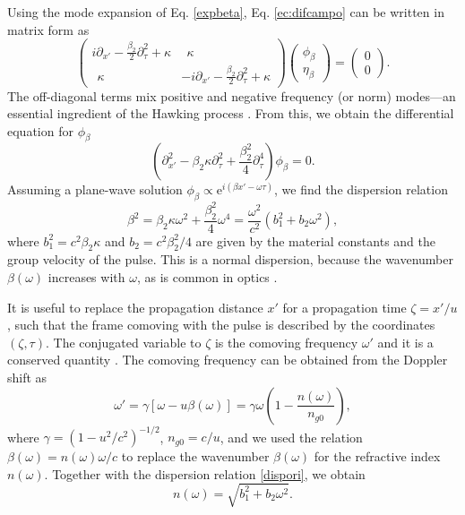 \documentclass[aps,pra,reprint,amsmath,amssymb,showpacs,groupedaddress,floatfix]{revtex4-1}
\begin{document}
Using the mode expansion of Eq. \eqref{expbeta}, Eq. \eqref{ec:difcampo} can be written in matrix form as
\begin{equation}
\begin{pmatrix}	
i\partial_{x'}-\frac{\beta_2}{2}\partial_{\tau}^2+\kappa & \ \ \kappa\\ 
\ \ \kappa & -i\partial_{x'}-\frac{\beta_2}{2}\partial_{\tau}^2+ \kappa
\end{pmatrix}\begin{pmatrix}
\phi_{\beta}\\
\eta_{\beta}
\end{pmatrix}=\begin{pmatrix}
0\\
0
\end{pmatrix}.
\end{equation}
The off-diagonal terms mix positive and negative frequency (or norm) modes---an essential ingredient of the Hawking process \cite{Robertson2012jpb}. From this, we obtain the differential equation for $\phi_\beta$
\begin{equation}
\left(\partial_{x'}^2-\beta_2\kappa\partial_{\tau}^2+\frac{\beta_2^2}{4}\partial_{\tau}^4\right)\phi_{\beta}=0.
\label{waveeq}
\end{equation}
Assuming a plane-wave solution $\phi_{\beta}\propto \text{e}^{i(\beta x'-\omega\tau)}$, we find the dispersion relation
\begin{equation}\label{dispori}
\beta^2=\beta_2 \kappa \omega^2+\frac{\beta_2^2}{4}\omega^4=\frac{\omega^2}{c^2}\left(b_1^2+b_2\omega^2\right),
\end{equation}
where $b_1^2=c^2\beta_2 \kappa$ and $b_2=c^2\beta_2^2/4$ are given by the material constants and the group velocity of the pulse. This is a normal dispersion, because the wavenumber $\beta(\omega)$ increases with $\omega$, as is common in optics \cite{GaonaReyes2017}.

It is useful to replace the propagation distance $x'$ for a propagation time $\zeta=x'/u$, such that the frame comoving with the pulse is described by the coordinates $(\zeta,\tau)$. The conjugated variable to $\zeta$ is the comoving frequency $\omega'$ and it is a conserved quantity \cite{Bermudez2016pra,Robertson2012jpb}. The comoving frequency can be obtained from the Doppler shift as
\begin{equation}\label{ecdoppler}
\omega'=\gamma[\omega-u\beta(\omega)]=\gamma\omega\left(1-\frac{n(\omega)}{n_{g0}}\right),
\end{equation}
where $\gamma=(1-u^2/c^2)^{-1/2}$, $n_{g0}=c/u$, and we used the relation $\beta(\omega)=n(\omega)\omega/c$ to replace the wavenumber $\beta(\omega)$ for the refractive index $n(\omega)$. Together with the dispersion relation \eqref{dispori}, we obtain 
\begin{equation}\label{nnew}
n(\omega)=\sqrt{b_1^2+b_2\omega^2}.
\end{equation}
\end{document}
